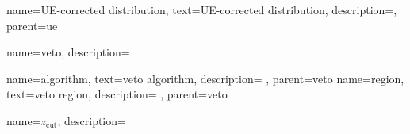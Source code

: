 {
    name=UE-corrected distribution,
    text=UE-corrected distribution,
    description={},
    parent=ue
}


{
    name=veto,
    description={}
}

{
    name=algorithm,
    text=veto algorithm,
    description={
    },
    parent=veto
}
{
    name=region,
    text=veto region,
    description={
    },
    parent=veto
}

{
  name=\ensuremath{z_{\text{cut}}},
  description={}
}
